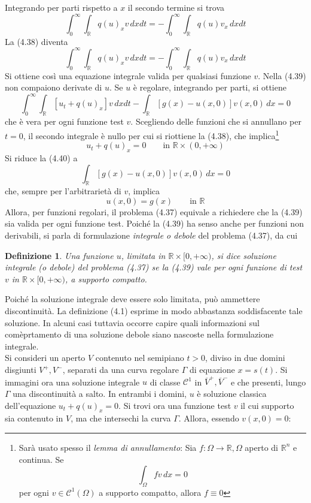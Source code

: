 \documentclass[a4paper,12pt, draft]{article}
\theoremstyle{break}
\newtheorem{definition}{Definizione}[section]
\numberwithin{equation}{section}
\begin{document}
Integrando per parti rispetto a \(x\) il secondo termine si trova
\[
  \int_0^{\infty} \int_{\mathbb{R}} q(u)_x v \, dxdt = -\int_0^{\infty}\int_{\mathbb{R}} q(u)v_x \, dxdt
\]
La (4.38) diventa
\begin{equation}
  \int_0^{\infty} \int_{\mathbb{R}} q(u)_x v \, dxdt = - \int_0^{\infty} \int_{\mathbb{R}} q(u) v_x \, dxdt
\end{equation}
Si ottiene così una equazione integrale valida per qualsiasi funzione \(v\). Nella (4.39) non compaiono derivate di \(u\). Se \(u\) è regolare, integrando per parti, si ottiene 
\begin{equation}
  \int_0^{\infty} \int_{\mathbb{R}} [u_t + q(u)_x]v \, dxdt - \int_{\mathbb{R}} [g(x) - u(x, 0)]v(x,0) \, dx = 0
\end{equation}
che è vera per ogni funzione test \(v\). Scegliendo delle funzioni che si annullano per \(t=0\), il secondo integrale è nullo per cui si riottiene la (4.38), che implica\footnote{Sarà usato spesso il \emph{lemma di annullamento}: Sia \(f:\Omega \to \mathbb{R}, \Omega\) aperto di \(\mathbb{R}^n\) e continua. Se 
\[
\int_{\Omega} fv \, dx = 0  
\]
per ogni \(v \in \mathcal{C}^1(\Omega)\) a supporto compatto, allora \(f \equiv 0\)}
\[
u_t + q(u)_x = 0 \qquad \mbox{in }  \mathbb{R} \times (0, +\infty)
\]
Si riduce la (4.40) a 
\[
  \int_{\mathbb{R}} [g(x) - u(x,0)]v(x,0) \, dx = 0
\]
che, sempre per l'arbitrarietà di \(v\), implica
\[
  u(x, 0) = g(x) \qquad \mbox{in }\mathbb{R}
\]
Allora, per funzioni regolari, il problema (4.37) equivale a richiedere che la (4.39) sia valida per ogni funzione test.
Poiché la (4.39) ha senso anche per funzioni non derivabili, si parla di formulazione \emph{integrale o debole} del problema (4.37), da cui
\begin{definition}
  Una funzione \(u\), limitata in \(\mathbb{R} \times [0, +\infty)\), si dice soluzione integrale (o debole) del problema (4.37) se la (4.39) vale per ogni funzione di test \(v\) in \(\mathbb{R} \times [0, +\infty)\), a supporto compatto.
\end{definition}
Poiché la soluzione integrale deve essere solo limitata, può ammettere discontinuità. La definizione (4.1) esprime in modo abbastanza soddisfacente tale soluzione. In alcuni casi tuttavia occorre capire quali informazioni sul comèprtamento di una soluzione debole siano nascoste nella formulazione integrale. \\
Si consideri un aperto \(V\) contenuto nel semipiano \(t > 0\), diviso in due domini disgiunti \(V^+, V^-\), separati da una curva regolare \(\Gamma\) di equazione \(x = s(t)\). Si immagini ora una soluzione integrale \(u\) di classe \(\mathcal{C}^1\) in \(\overline{V}^+, \overline{V}^-\) e che presenti, lungo \(\Gamma\) una discontinuità a salto. In entrambi i domini, \(u\) è soluzione classica dell'equazione \(u_t + q(u)_x = 0\). Si trovi ora una funzione test \(v\) il cui supporto sia contenuto in \(V\), ma che intersechi la curva \(\Gamma\). Allora, essendo \(v(x, 0) = 0\):
\end{document}
